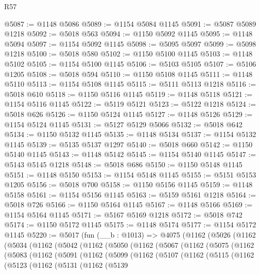 \begin{lexlean}{R57}
\begin{coremodule}
@5087 := @1148 @5086
@5089 := @1154 @5084 @1145
@5091 := @5087 @5089 @1218
@5092 := @5018 @563
@5094 := @1150 @5092 @1145
@5095 := @1148 @5094
@5097 := @1154 @5092 @1145
@5098 := @5095 @5097
@5099 := @5098 @1218
@5100 := @5018 @580
@5102 := @1150 @5100 @1145
@5103 := @1148 @5102
@5105 := @1154 @5100 @1145
@5106 := @5103 @5105
@5107 := @5106 @1205
@5108 := @5018 @594
@5110 := @1150 @5108 @1145
@5111 := @1148 @5110
@5113 := @1154 @5108 @1145
@5115 := @5111 @5113 @1218
@5116 := @5018 @610
@5118 := @1150 @5116 @1145
@5119 := @1148 @5118
@5121 := @1154 @5116 @1145
@5122 := @5119 @5121
@5123 := @5122 @1218
@5124 := @5018 @626
@5126 := @1150 @5124 @1145
@5127 := @1148 @5126
@5129 := @1154 @5124 @1145
@5131 := @5127 @5129 @5066
@5132 := @5018 @642
@5134 := @1150 @5132 @1145
@5135 := @1148 @5134
@5137 := @1154 @5132 @1145
@5139 := @5135 @5137 @1297
@5140 := @5018 @660
@5142 := @1150 @5140 @1145
@5143 := @1148 @5142
@5145 := @1154 @5140 @1145
@5147 := @5143 @5145 @1218
@5148 := @5018 @686
@5150 := @1150 @5148 @1145
@5151 := @1148 @5150
@5153 := @1154 @5148 @1145
@5155 := @5151 @5153 @1205
@5156 := @5018 @700
@5158 := @1150 @5156 @1145
@5159 := @1148 @5158
@5161 := @1154 @5156 @1145
@5163 := @5159 @5161 @1218
@5164 := @5018 @726
@5166 := @1150 @5164 @1145
@5167 := @1148 @5166
@5169 := @1154 @5164 @1145
@5171 := @5167 @5169 @1218
@5172 := @5018 @742
@5174 := @1150 @5172 @1145
@5175 := @1148 @5174
@5177 := @1154 @5172 @1145
@5220 := @5017
    (fun (__b : @1013) =>
    @4075
      (@1162
        (@5026
          (@1162
            (@5034
              (@1162
                (@5042
                  (@1162
                    (@5050
                      (@1162
                        (@5067
                          (@1162
                            (@5075
                              (@1162
                                (@5083
                                  (@1162
                                    (@5091
                                      (@1162
                                        (@5099
                                          (@1162
                                            (@5107
                                              (@1162
                                                (@5115
                                                  (@1162
                                                    (@5123
                                                      (@1162
                                                        (@5131
                                                          (@1162
                                                            (@5139

\end{coremodule}
\end{lexlean}
